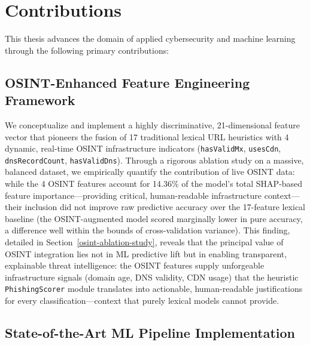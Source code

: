 \section{Contributions}\label{contributions}

This thesis advances the domain of applied cybersecurity and machine
learning through the following primary contributions:

\subsection{OSINT-Enhanced Feature Engineering
Framework}\label{osint-enhanced-feature-engineering-framework}

We conceptualize and implement a highly discriminative, 21-dimensional
feature vector that pioneers the fusion of 17 traditional lexical URL
heuristics with 4 dynamic, real-time OSINT infrastructure indicators
(\texttt{hasValidMx}, \texttt{usesCdn}, \texttt{dnsRecordCount},
\texttt{hasValidDns}). Through a rigorous ablation study on a massive,
balanced dataset, we empirically quantify the contribution of live OSINT
data: while the 4 OSINT features account for 14.36\% of the model's
total SHAP-based feature importance---providing critical,
human-readable infrastructure context---their inclusion did not improve
raw predictive accuracy over the 17-feature lexical baseline (the
OSINT-augmented model scored marginally lower in pure accuracy, a
difference well within the bounds of cross-validation variance). This
finding, detailed in Section~\ref{osint-ablation-study}, reveals that
the principal value of OSINT integration lies not in ML predictive lift
but in enabling transparent, explainable threat intelligence: the OSINT
features supply unforgeable infrastructure signals (domain age, DNS
validity, CDN usage) that the heuristic \texttt{PhishingScorer} module
translates into actionable, human-readable justifications for every
classification---context that purely lexical models cannot provide.

\subsection{State-of-the-Art ML Pipeline
Implementation}\label{state-of-the-art-ml-pipeline-implementation}

